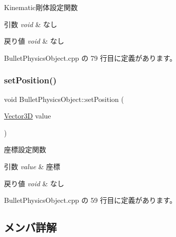 Kinematic剛体設定関数 


\begin{DoxyParams}{引数}
{\em void} & なし \\
\hline
\end{DoxyParams}

\begin{DoxyRetVals}{戻り値}
{\em void} & なし \\
\hline
\end{DoxyRetVals}


 Bullet\+Physics\+Object.\+cpp の 79 行目に定義があります。

\mbox{\label{class_bullet_physics_object_a6a5196bc2fc1fad94bc65a26ff9d5cad}} 
\subsubsection{\texorpdfstring{set\+Position()}{setPosition()}}
{\footnotesize\ttfamily void Bullet\+Physics\+Object\+::set\+Position (\begin{DoxyParamCaption}\item[{\mbox{\hyperlink{class_vector3_d}{Vector3D}}}]{value }\end{DoxyParamCaption})}



座標設定関数 


\begin{DoxyParams}{引数}
{\em value} & 座標 \\
\hline
\end{DoxyParams}

\begin{DoxyRetVals}{戻り値}
{\em void} & なし \\
\hline
\end{DoxyRetVals}


 Bullet\+Physics\+Object.\+cpp の 59 行目に定義があります。



\subsection{メンバ詳解}
\mbox{\label{class_bullet_physics_object_a1dfb431c0eefdacf3cfc1ba3ae104457}} 

